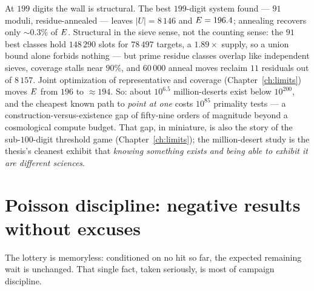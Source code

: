 At $199$ digits the wall is structural. The best $199$-digit system
found --- $91$ moduli, residue-annealed --- leaves $|U|=8\,146$ and
$E=196.4$; annealing recovers only $\sim0.3\%$ of $E$. Structural in
the sieve sense, not the counting sense: the $91$ best classes hold
$148\,290$ slots for $78\,497$ targets, a $1.89\times$ supply, so a
union bound alone forbids nothing --- but prime residue classes overlap
like independent sieves, coverage stalls near $90\%$, and $60\,000$
anneal moves reclaim $11$ residuals out of $8\,157$. Joint optimization
of representative and coverage (Chapter~\ref{ch:limits}) moves
$E$ from $196$ to $\approx194$. So: about $10^{6.5}$ million-deserts
exist below $10^{200}$, and the cheapest known path to \emph{point at
one} costs $10^{85}$ primality tests --- a construction-versus-existence
gap of fifty-nine orders of magnitude beyond a cosmological compute
budget. That gap, in miniature, is also the story of the sub-$100$-digit
threshold game (Chapter~\ref{ch:limits}); the million-desert study is
the thesis's cleanest exhibit that \emph{knowing something exists and
being able to exhibit it are different sciences}.

\section{Poisson discipline: negative results without excuses}\label{sec:poisson}

The lottery is memoryless: conditioned on no hit so far, the expected
remaining wait is unchanged. That single fact, taken seriously, is most
of campaign discipline.

